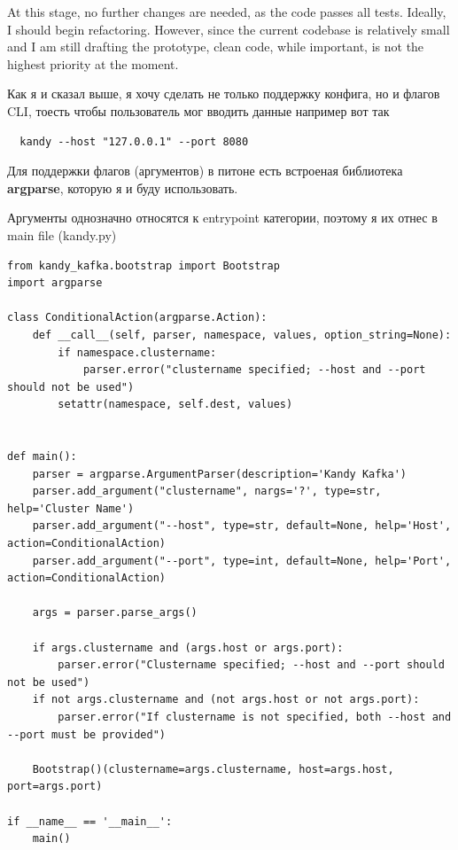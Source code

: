\documentclass[10pt , a4paper]{report}
\newenvironment{code}{\captionsetup{type=listing}}{}
\begin{document}
At this stage, no further changes are needed, as the code passes all tests. Ideally, I should begin refactoring. However, since the current codebase is relatively small and I am still drafting the prototype, clean code, while important, is not the highest priority at the moment.

Как я и сказал выше, я хочу сделать не только поддержку конфига, но и флагов CLI, тоесть чтобы пользователь мог вводить данные например вот так

\begin{code}
  \begin{verbatim}
  kandy --host "127.0.0.1" --port 8080
  \end{verbatim}
\end{code}

Для поддержки флагов (аргументов) в питоне есть встроеная библиотека \textbf{argparse}, которую я и буду использовать.

Аргументы однозначно относятся к entrypoint категории, поэтому я их отнес в main file (kandy.py) 

\begin{code}
  \begin{verbatim}
from kandy_kafka.bootstrap import Bootstrap
import argparse

class ConditionalAction(argparse.Action):
    def __call__(self, parser, namespace, values, option_string=None):
        if namespace.clustername:
            parser.error("clustername specified; --host and --port should not be used")
        setattr(namespace, self.dest, values)


def main():
    parser = argparse.ArgumentParser(description='Kandy Kafka')
    parser.add_argument("clustername", nargs='?', type=str, help='Cluster Name')
    parser.add_argument("--host", type=str, default=None, help='Host', action=ConditionalAction)
    parser.add_argument("--port", type=int, default=None, help='Port', action=ConditionalAction)

    args = parser.parse_args()

    if args.clustername and (args.host or args.port):
        parser.error("Clustername specified; --host and --port should not be used")
    if not args.clustername and (not args.host or not args.port):
        parser.error("If clustername is not specified, both --host and --port must be provided")

    Bootstrap()(clustername=args.clustername, host=args.host, port=args.port)

if __name__ == '__main__':
    main()
  \end{verbatim}
\end{code}
\end{document}

